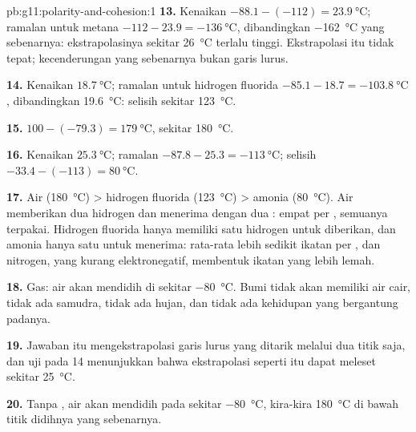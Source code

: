 \begin{solution}{pb:g11:polarity-and-cohesion:1}
\textbf{13.} Kenaikan $-88.1 - (-112) = \qty{23.9}{\celsius}$; ramalan
untuk metana $-112 - 23.9 = \qty{-136}{\celsius}$, dibandingkan
\qty{-162}{\celsius} yang sebenarnya: ekstrapolasinya sekitar
\qty{26}{\celsius} terlalu tinggi. Ekstrapolasi itu tidak tepat;
kecenderungan yang sebenarnya bukan garis lurus.

\textbf{14.} Kenaikan $\qty{18.7}{\celsius}$; ramalan untuk hidrogen
fluorida $-85.1 - 18.7 = \qty{-103.8}{\celsius}$, dibandingkan
\qty{19.6}{\celsius}: selisih sekitar \qty{123}{\celsius}.

\textbf{15.} $100 - (-79.3) = \qty{179}{\celsius}$, sekitar
\qty{180}{\celsius}.

\textbf{16.} Kenaikan $\qty{25.3}{\celsius}$; ramalan $-87.8 - 25.3 =
\qty{-113}{\celsius}$; selisih $-33.4 - (-113) = \qty{80}{\celsius}$.

\textbf{17.} Air (\qty{180}{\celsius}) > hidrogen fluorida
(\qty{123}{\celsius}) > amonia (\qty{80}{\celsius}). Air memberikan dua
 hidrogen dan menerima dengan dua : empat
 per , semuanya terpakai. Hidrogen fluorida hanya
memiliki satu hidrogen untuk diberikan, dan amonia hanya satu  untuk menerima: rata-rata lebih sedikit ikatan per
, dan nitrogen, yang kurang elektronegatif, membentuk ikatan yang
lebih lemah.

\textbf{18.} Gas: air akan mendidih di sekitar \qty{-80}{\celsius}. Bumi
tidak akan memiliki air cair, tidak ada samudra, tidak ada hujan, dan
tidak ada kehidupan yang bergantung padanya.

\textbf{19.} Jawaban itu mengekstrapolasi garis lurus yang ditarik
melalui dua titik saja, dan uji pada  14 menunjukkan bahwa
ekstrapolasi seperti itu dapat meleset sekitar \qty{25}{\celsius}.

\textbf{20.} Tanpa , air akan mendidih pada sekitar
\qty{-80}{\celsius}, kira-kira \qty{180}{\celsius} di bawah titik
didihnya yang sebenarnya.
\end{solution}
